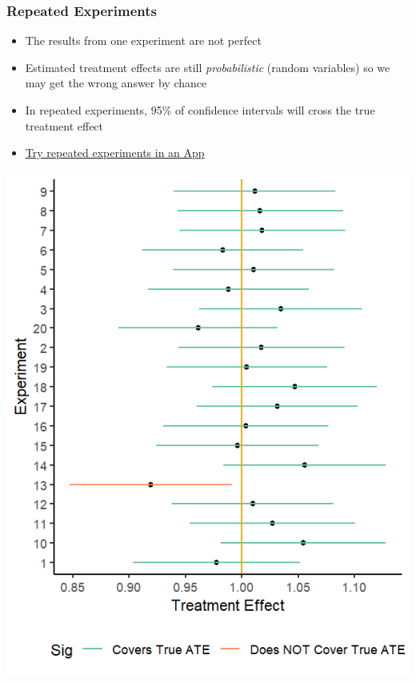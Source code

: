 \documentclass[xcolor=x11names,compress]{beamer}\usepackage[]{graphicx}\usepackage[]{color}
\makeatletter
\def\maxwidth{ %
  \ifdim\Gin@nat@width>\linewidth
    \linewidth
  \else
    \Gin@nat@width
  \fi
}
\newenvironment{knitrout}{}{} %
\renewcommand{\(}{\begin{columns}}
\renewcommand{\)}{\end{columns}}
\newcommand{\<}[1]{\begin{column}{#1}}
\renewcommand{\>}{\end{column}}
\makeatother
\begin{document}
\begin{frame}
\frametitle{Repeated Experiments}
\begin{multicols}{2}
\begin{itemize}
\item The results from one experiment are not perfect
\pause
\item Estimated treatment effects are still \textit{probabilistic} (random variables) so we may get the wrong answer by chance
\pause
\item In repeated experiments, 95\% of confidence intervals will cross the true treatment effect
\pause
\item \href{https://poliong.shinyapps.io/to_deploy/}{Try repeated experiments in an App}
\pause
\end{itemize}
\columnbreak
\begin{knitrout}
\color{fgcolor}
\includegraphics[width=\maxwidth]{figure/repeated_exp-1} 

\end{knitrout}
\end{multicols}
\end{frame}
\end{document}

